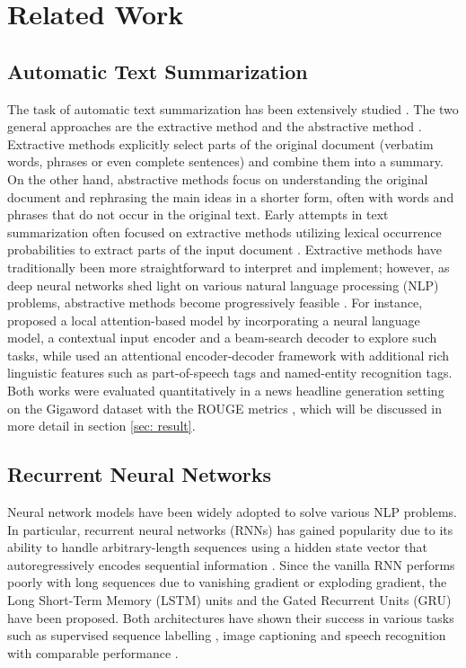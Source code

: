 \section{Related Work}
\label{sec: related_work}

\subsection{Automatic Text Summarization}

The task of automatic text summarization has been extensively studied \cite{gambhir2017recent}. The two general approaches are the extractive method and the abstractive method \cite{gupta2010survey}. Extractive methods explicitly select parts of the original document (verbatim words, phrases or even complete sentences) and combine them into a summary. On the other hand, abstractive methods focus on understanding the original document and rephrasing the main ideas in a shorter form, often with words and phrases that do not occur in the original text. Early attempts in text summarization often focused on extractive methods utilizing lexical occurrence probabilities to extract parts of the input document \cite{mathis1973improvement}. Extractive methods have traditionally been more straightforward to interpret and implement; however, as deep neural networks shed light on various natural language processing (NLP) problems, abstractive methods become progressively feasible \cite{nallapati2016sequence, nallapati2016abstractive, rush2015neural}. For instance, \cite{rush2015neural} proposed a local attention-based model by incorporating a neural language model, a contextual input encoder and a beam-search decoder to explore such tasks, while \cite{nallapati2016abstractive} used an attentional encoder-decoder framework with additional rich linguistic features such as part-of-speech tags and named-entity recognition tags. Both works were evaluated quantitatively in a news headline generation setting on the Gigaword dataset \cite{graff2003english} with the ROUGE metrics \cite{lin2004rouge}, which will be discussed in more detail in section \ref{sec: result}. 

\subsection{Recurrent Neural Networks}
Neural network models have been widely adopted to solve various NLP problems. In particular, recurrent neural networks (RNNs) has gained popularity due to its ability to handle arbitrary-length sequences using a hidden state vector that autoregressively encodes sequential information \cite{goodfellow2016}. Since the vanilla RNN performs poorly with long sequences due to vanishing gradient or exploding gradient, the Long Short-Term Memory (LSTM) units \cite{hochreiter1997long} and the Gated Recurrent Units (GRU) \cite{cho2014properties} have been proposed. Both architectures have shown their success in various tasks such as supervised sequence labelling \cite{graves2012supervised}, image captioning \cite{vinyals_2015} and speech recognition \cite{graves2013speech} with comparable performance \cite{yin2017comparative}.

